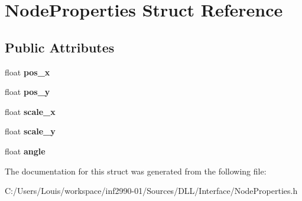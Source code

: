 \hypertarget{struct_node_properties}{}\section{Node\+Properties Struct Reference}
\label{struct_node_properties}
\subsection*{Public Attributes}
\begin{DoxyCompactItemize}
\item 
\hypertarget{struct_node_properties_a5c3926e71b48fc207c660879d3605b9c}{}float {\bfseries pos\+\_\+x}\label{struct_node_properties_a5c3926e71b48fc207c660879d3605b9c}

\item 
\hypertarget{struct_node_properties_ac367066fcf3484c36f71b9f8907207bc}{}float {\bfseries pos\+\_\+y}\label{struct_node_properties_ac367066fcf3484c36f71b9f8907207bc}

\item 
\hypertarget{struct_node_properties_a49637b6297462ecd714bf0cdf9584381}{}float {\bfseries scale\+\_\+x}\label{struct_node_properties_a49637b6297462ecd714bf0cdf9584381}

\item 
\hypertarget{struct_node_properties_a0efed2f7fd0a28c6a3a58bbf5e771d53}{}float {\bfseries scale\+\_\+y}\label{struct_node_properties_a0efed2f7fd0a28c6a3a58bbf5e771d53}

\item 
\hypertarget{struct_node_properties_a512b63456ff635298229e9b6207566ac}{}float {\bfseries angle}\label{struct_node_properties_a512b63456ff635298229e9b6207566ac}

\end{DoxyCompactItemize}


The documentation for this struct was generated from the following file\+:\begin{DoxyCompactItemize}
\item 
C\+:/\+Users/\+Louis/workspace/inf2990-\/01/\+Sources/\+D\+L\+L/\+Interface/Node\+Properties.\+h\end{DoxyCompactItemize}
